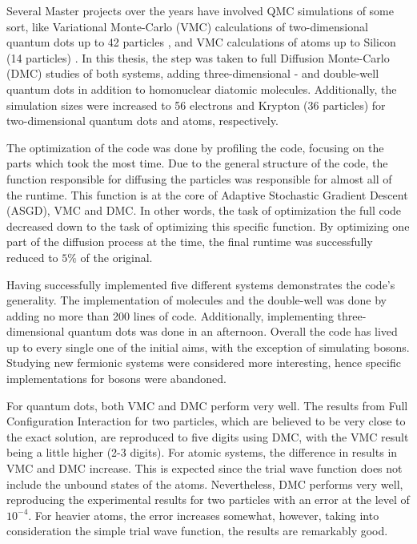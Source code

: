 Several Master projects over the years have involved QMC simulations of some sort, like Variational Monte-Carlo (VMC) calculations of two-dimensional quantum dots up to 42 particles \cite{larseivind}, and VMC calculations of atoms up to Silicon (14 particles) \cite{vmcAtoms}. In this thesis, the step was taken to full Diffusion Monte-Carlo (DMC) studies of both systems, adding three-dimensional - and double-well quantum dots in addition to homonuclear diatomic molecules. Additionally, the simulation sizes were increased to 56 electrons and Krypton (36 particles) for two-dimensional quantum dots and atoms, respectively.    

The optimization of the code was done by profiling the code, focusing on the parts which took the most time. Due to the general structure of the code, the function responsible for diffusing the particles was responsible for almost all of the runtime. This function is at the core of Adaptive Stochastic Gradient Descent (ASGD), VMC and DMC. In other words, the task of optimization the full code decreased down to the task of optimizing this specific function. By optimizing one part of the diffusion process at the time, the final runtime was successfully reduced to $5\%$ of the original.

Having successfully implemented five different systems demonstrates the code's generality. The implementation of molecules and the double-well was done by adding no more than 200 lines of code. Additionally,  implementing three-dimensional quantum dots was done in an afternoon. Overall the code has lived up to every single one of the initial aims, with the exception of simulating bosons. Studying new fermionic systems were considered more interesting, hence specific implementations for bosons were abandoned.  

For quantum dots, both VMC and DMC perform very well. The results from Full Configuration Interaction \cite{Olsen} for two particles, which are believed to be very close to the exact solution, are reproduced to five digits using DMC, with the VMC result being a little higher (2-3 digits). For atomic systems, the difference in results in VMC and DMC increase. This is expected since the trial wave function does not include the unbound states of the atoms. Nevertheless, DMC performs very well, reproducing the experimental results for two particles with an error at the level of $10^{-4}$. For heavier atoms, the error increases somewhat, however, taking into consideration the simple trial wave function, the results are remarkably good.

